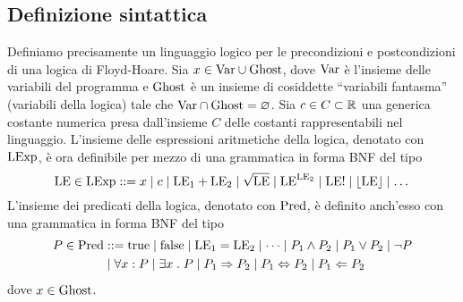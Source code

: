 \subsection{Definizione sintattica}

Definiamo precisamente un linguaggio logico per le
precondizioni e postcondizioni di una logica di Floyd-Hoare.
Sia $x \in \mathrm{Var} \cup \mathrm{Ghost}$, dove $\mathrm{Var}$ è l'insieme delle variabili del
programma e $\mathrm{Ghost}$ è un insieme di cosiddette ``variabili fantasma''
(variabili della logica) tale che $\mathrm{Var} \cap \mathrm{Ghost} = \varnothing$.
Sia $c \in C \subset \mathbb{R}$ una generica costante numerica presa dall'insieme
$C$ delle costanti rappresentabili nel linguaggio.
L'insieme delle espressioni aritmetiche della logica, denotato con $\mathrm{LExp}$,
è ora definibile per mezzo di una grammatica in forma BNF del tipo
\[
  \mathrm{LE} \in \mathrm{LExp} ::= x
                \mathrel{\mid} c
                \mathrel{\mid} \mathrm{LE}_1 + \mathrm{LE}_2
                \mathrel{\mid} \sqrt{\mathrm{LE}}
                \mathrel{\mid} \mathrm{LE}^{\mathrm{LE}_2}
                \mathrel{\mid} \mathrm{LE}!
                \mathrel{\mid} \lfloor \mathrm{LE} \rfloor
                \mathrel{\mid} \dots
\]
L'insieme dei predicati della logica, denotato con $\mathrm{Pred}$, è definito anch'esso con una grammatica in forma BNF del tipo
\begin{align*}
P \in \Pred &::= \true
            \vbar \false
            \vbar\LE_1 = \LE_2
            \vbar \dots
            \vbar P_1 \land P_2
            \vbar P_1 \lor P_2
            \vbar \neg P \\
            &\vbar \forall x \itc P
            \vbar \exists x \st P
            \vbar P_1 \Rightarrow P_2
            \vbar P_1 \Leftrightarrow P_2 \vbar P_1 \Leftarrow P_2
\end{align*}
dove $x \in\mathrm{Ghost}$.

